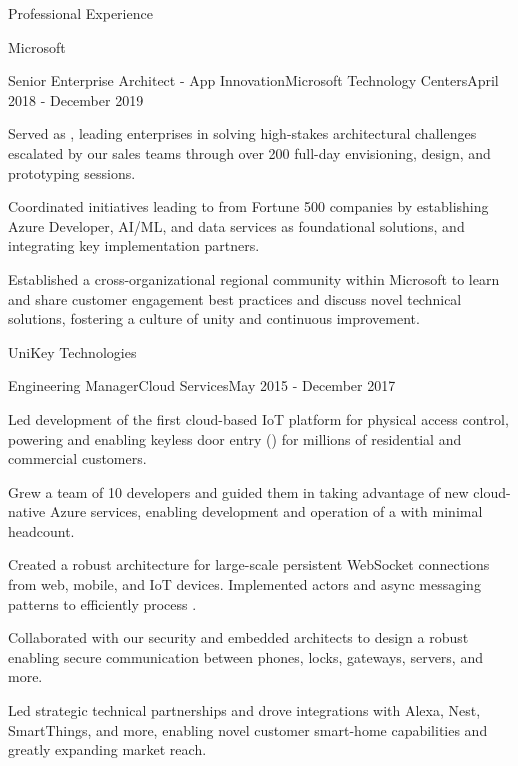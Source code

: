 \documentclass{resume} %
\begin{document}
\begin{rSection}{Professional Experience}
\begin{rCompany}{Microsoft}{}{}
    \begin{rRole}{Senior Enterprise Architect - App Innovation}{Microsoft Technology Centers}{April 2018 - December 2019}
        \item Served as , leading enterprises in solving high-stakes architectural challenges escalated by our sales teams through over 200 full-day envisioning, design, and prototyping sessions. 
        \item Coordinated initiatives leading to  from Fortune 500 companies by establishing Azure Developer, AI/ML, and data services as foundational solutions, and integrating key implementation partners.
        \item Established a cross-organizational regional community within Microsoft to learn and share customer engagement best practices and discuss novel technical solutions, fostering a culture of unity and continuous improvement.
    \end{rRole}
  \end{rCompany}

  \begin{rCompany}{UniKey Technologies}{}{}
    \begin{rRole}{Engineering Manager}{Cloud Services}{May 2015 - December 2017}
      \item Led development of the first cloud-based IoT platform for physical access control, powering  and enabling keyless door entry () for millions of residential and commercial customers.
      \item Grew a team of 10 developers and guided them in taking advantage of new cloud-native Azure services, enabling development and operation of a  with minimal headcount.
      \item Created a robust architecture for large-scale persistent WebSocket connections from web, mobile, and IoT devices. Implemented actors and async messaging patterns to efficiently process .
      \item Collaborated with our security and embedded architects to design a robust  enabling secure communication between phones, locks, gateways, servers, and more.
      \item Led strategic technical partnerships and drove integrations with  Alexa,  Nest,  SmartThings, and more, enabling novel customer smart-home capabilities and greatly expanding market reach.
    \end{rRole}
  \end{rCompany}


\end{rSection}
\end{document}
